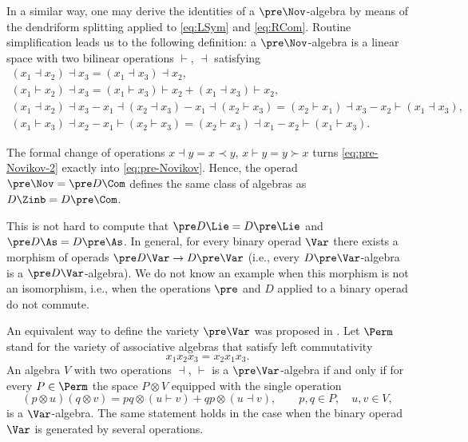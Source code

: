 In a similar way, one may derive the identities
of a $\pre\Nov$-algebra by means of the dendriform
splitting applied to \eqref{eq:LSym} and \eqref{eq:RCom}.
Routine simplification leads us to the following
definition: a $\pre\Nov$-algebra is a linear space with
two bilinear operations $\vdash $, $\dashv$ satisfying
%
\begin{gather}
 (x_1\dashv x_2)\dashv x_3 = (x_1\dashv x_3)\dashv x_2, \nonumber\\
 (x_1\vdash x_2)\dashv x_3 = (x_1\vdash x_3)\vdash x_2 + (x_1\dashv x_3)\vdash x_2, \nonumber\\
 (x_1\dashv x_2)\dashv x_3 - x_1\dashv (x_2\dashv x_3) - x_1\dashv (x_2\vdash x_3)
 =
 (x_2\vdash x_1)\dashv x_3 - x_2\vdash (x_1\dashv x_3),
 \nonumber\\
 (x_1\vdash x_3)\dashv x_2 - x_1\vdash (x_2\vdash x_3)
 =
 (x_2\vdash x_3)\dashv x_1 - x_2\vdash (x_1\vdash x_3).\label{eq:pre-Novikov-2}
\end{gather}

The formal change of operations $x\dashv y = x\prec y$, $x\vdash y = y\succ x$
turns \eqref{eq:pre-Novikov-2} exactly into \eqref{eq:pre-Novikov}.
Hence, the operad $\pre\Nov = \pre D\Com$ defines
the same class of algebras as $D\Zinb = D\pre\Com $.

\begin{Remark}
This is not hard to compute that
$\pre D\Lie = D\pre\Lie$ and $\pre D\As = D\pre\As$.
In general, for every binary operad $\Var $ there exists
a morphism of operads $\pre D\Var \to D\pre\Var $
(i.e., every $D\pre\Var $-algebra is a $\pre D\Var$-algebra).
We do not know an example when
this morphism is not an isomorphism, i.e., when the
operations $\pre$ and $D$ applied to a binary operad
do not commute.
\end{Remark}

An equivalent way to define the variety
$\pre\Var $ was proposed in \cite{GubKol2014}.
Let $\Perm $ stand for the variety of associative
algebras that satisfy left commutativity
\[
x_1x_2x_3 = x_2x_1x_3.
\]
An algebra $V$ with two operations $\dashv$, $\vdash $
is a $\pre\Var$-algebra if and only if
for every $P\in \Perm $ the space
$P\otimes V$ equipped with the single operation
%
\begin{equation}\label{eq:Dend-Perm}
(p\otimes u)(q\otimes v) = pq\otimes (u\vdash v) +
qp\otimes (u\dashv v),
\qquad
p,q\in P,\quad u,v\in V,
\end{equation}
%
is a $\Var $-algebra.
The same statement holds in the case when the binary operad
$\Var $ is generated by several operations.

